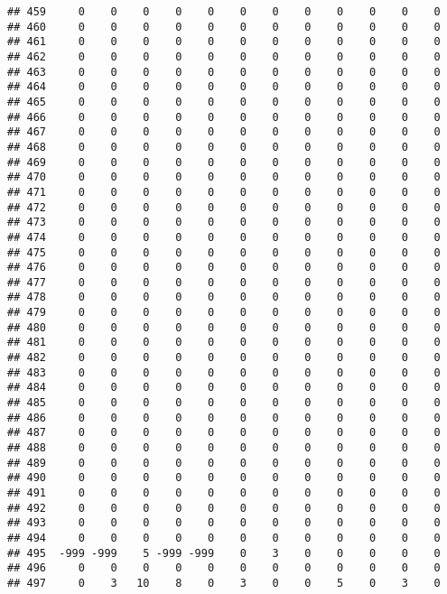 \documentclass[]{article}
\begin{document}
\begin{verbatim}
## 459     0    0    0    0    0    0    0    0    0    0    0    0
## 460     0    0    0    0    0    0    0    0    0    0    0    0
## 461     0    0    0    0    0    0    0    0    0    0    0    0
## 462     0    0    0    0    0    0    0    0    0    0    0    0
## 463     0    0    0    0    0    0    0    0    0    0    0    0
## 464     0    0    0    0    0    0    0    0    0    0    0    0
## 465     0    0    0    0    0    0    0    0    0    0    0    0
## 466     0    0    0    0    0    0    0    0    0    0    0    0
## 467     0    0    0    0    0    0    0    0    0    0    0    0
## 468     0    0    0    0    0    0    0    0    0    0    0    0
## 469     0    0    0    0    0    0    0    0    0    0    0    0
## 470     0    0    0    0    0    0    0    0    0    0    0    0
## 471     0    0    0    0    0    0    0    0    0    0    0    0
## 472     0    0    0    0    0    0    0    0    0    0    0    0
## 473     0    0    0    0    0    0    0    0    0    0    0    0
## 474     0    0    0    0    0    0    0    0    0    0    0    0
## 475     0    0    0    0    0    0    0    0    0    0    0    0
## 476     0    0    0    0    0    0    0    0    0    0    0    0
## 477     0    0    0    0    0    0    0    0    0    0    0    0
## 478     0    0    0    0    0    0    0    0    0    0    0    0
## 479     0    0    0    0    0    0    0    0    0    0    0    0
## 480     0    0    0    0    0    0    0    0    0    0    0    0
## 481     0    0    0    0    0    0    0    0    0    0    0    0
## 482     0    0    0    0    0    0    0    0    0    0    0    0
## 483     0    0    0    0    0    0    0    0    0    0    0    0
## 484     0    0    0    0    0    0    0    0    0    0    0    0
## 485     0    0    0    0    0    0    0    0    0    0    0    0
## 486     0    0    0    0    0    0    0    0    0    0    0    0
## 487     0    0    0    0    0    0    0    0    0    0    0    0
## 488     0    0    0    0    0    0    0    0    0    0    0    0
## 489     0    0    0    0    0    0    0    0    0    0    0    0
## 490     0    0    0    0    0    0    0    0    0    0    0    0
## 491     0    0    0    0    0    0    0    0    0    0    0    0
## 492     0    0    0    0    0    0    0    0    0    0    0    0
## 493     0    0    0    0    0    0    0    0    0    0    0    0
## 494     0    0    0    0    0    0    0    0    0    0    0    0
## 495  -999 -999    5 -999 -999    0    3    0    0    0    0    0
## 496     0    0    0    0    0    0    0    0    0    0    0    0
## 497     0    3   10    8    0    3    0    0    5    0    3    0

\end{verbatim}
\end{document}
